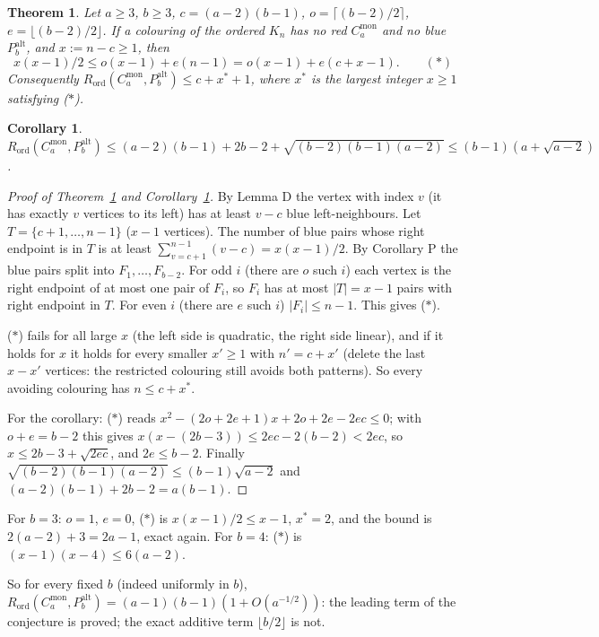 \documentclass[11pt]{article}
\newcommand{\Rord}{R_{\mathrm{ord}}}
\newcommand{\Cmon}[1]{C_{#1}^{\mathrm{mon}}}
\newcommand{\Palt}[1]{P_{#1}^{\mathrm{alt}}}
\theoremstyle{plain}
\newtheorem{theorem}{Theorem}
\newtheorem{corollary}{Corollary}
\theoremstyle{remark}
\begin{document}
\begin{theorem}\label{thm:gen}
Let $a \geq 3$, $b \geq 3$, $c = (a-2)(b-1)$, $o = \lceil (b-2)/2 \rceil$, $e = \lfloor (b-2)/2 \rfloor$. If a
colouring of the ordered $K_n$ has no red $\Cmon{a}$ and no blue $\Palt{b}$, and $x := n - c \geq 1$, then
\[
  x(x-1)/2 \leq o(x-1) + e(n-1) = o(x-1) + e(c + x - 1). \qquad (*)
\]
Consequently $\Rord(\Cmon{a}, \Palt{b}) \leq c + x^* + 1$, where $x^*$ is the largest integer $x \geq 1$
satisfying ($*$).
\end{theorem}

\begin{corollary}\label{cor:gen}
$\Rord(\Cmon{a}, \Palt{b}) \leq (a-2)(b-1) + 2b - 2 + \sqrt{(b-2)(b-1)(a-2)} \leq (b-1)(a + \sqrt{a-2})$.
\end{corollary}

\begin{proof}[Proof of Theorem~\ref{thm:gen} and Corollary~\ref{cor:gen}]
By Lemma D the vertex with index $v$ (it has exactly $v$ vertices to its left) has at least $v - c$ blue
left-neighbours. Let $T = \{c+1, \dots, n-1\}$ ($x-1$ vertices). The number of blue pairs whose right endpoint is
in $T$ is at least $\sum_{v=c+1}^{n-1} (v-c) = x(x-1)/2$. By Corollary P the blue pairs split into
$F_1, \dots, F_{b-2}$. For odd $i$ (there are $o$ such $i$) each vertex is the right endpoint of at most one pair
of $F_i$, so $F_i$ has at most $|T| = x-1$ pairs with right endpoint in $T$. For even $i$ (there are $e$ such $i$)
$|F_i| \leq n-1$. This gives ($*$).

($*$) fails for all large $x$ (the left side is quadratic, the right side linear), and if it holds for $x$ it
holds for every smaller $x' \geq 1$ with $n' = c + x'$ (delete the last $x - x'$ vertices: the restricted
colouring still avoids both patterns). So every avoiding colouring has $n \leq c + x^*$.

For the corollary: ($*$) reads $x^2 - (2o+2e+1)x + 2o + 2e - 2ec \leq 0$; with $o + e = b-2$ this gives
$x(x - (2b-3)) \leq 2ec - 2(b-2) < 2ec$, so $x \leq 2b-3 + \sqrt{2ec}$, and $2e \leq b-2$. Finally
$\sqrt{(b-2)(b-1)(a-2)} \leq (b-1)\sqrt{a-2}$ and $(a-2)(b-1) + 2b - 2 = a(b-1)$.
\end{proof}

For $b = 3$: $o = 1$, $e = 0$, ($*$) is $x(x-1)/2 \leq x-1$, $x^* = 2$, and the bound is $2(a-2)+3 = 2a-1$, exact
again. For $b = 4$: ($*$) is $(x-1)(x-4) \leq 6(a-2)$.

So for every fixed $b$ (indeed uniformly in $b$), $\Rord(\Cmon{a}, \Palt{b}) = (a-1)(b-1)(1 + O(a^{-1/2}))$: the
leading term of the conjecture is proved; the exact additive term $\lfloor b/2 \rfloor$ is not.
\end{document}
